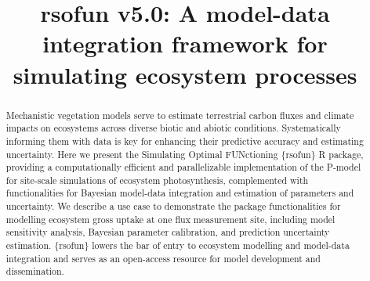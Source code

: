 \documentclass[gmd, manuscript]{copernicus}
\begin{document}
\title{rsofun v5.0: A model-data integration framework for simulating ecosystem processes}






\received{}
\pubdiscuss{} %
\revised{}
\accepted{}
\published{}



\maketitle

\begin{abstract}

Mechanistic vegetation models serve to estimate terrestrial carbon fluxes and climate impacts on ecosystems across diverse biotic and abiotic conditions.
Systematically informing them with data is key for enhancing their predictive accuracy and estimating uncertainty.
Here we present the Simulating Optimal FUNctioning \{rsofun\} R package, providing a computationally efficient and parallelizable implementation of the P-model for site-scale simulations of ecosystem photosynthesis, complemented with functionalities for Bayesian model-data integration and estimation of parameters and uncertainty.
We describe a use case to demonstrate the package functionalities for modelling ecosystem gross  uptake at one flux measurement site, including model sensitivity analysis, Bayesian parameter calibration, and prediction uncertainty estimation.
\{rsofun\} lowers the bar of entry to ecosystem modelling and model-data integration and serves as an open-access resource for model development and dissemination.
\end{abstract}
\end{document}
